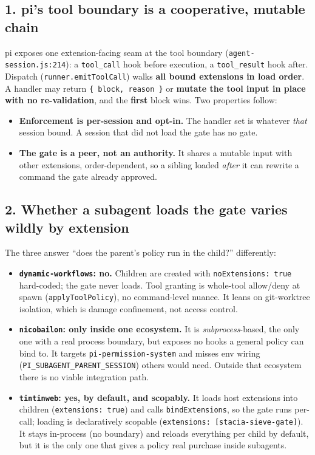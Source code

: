 \documentclass[11pt]{article}
\newcommand{\code}[1]{\texttt{#1}}
\begin{document}
\subsection*{1. pi's tool boundary is a cooperative, mutable chain}

pi exposes one extension-facing seam at the tool boundary
(\code{agent-session.js:214}): a \code{tool\_call} hook before execution, a
\code{tool\_result} hook after. Dispatch (\code{runner.emitToolCall}) walks
\textbf{all bound extensions in load order}. A handler may return
\code{\{ block, reason \}} or \textbf{mutate the tool input in place with no
re-validation}, and the \textbf{first} block wins. Two properties follow:

\begin{itemize}
  \item \textbf{Enforcement is per-session and opt-in.} The handler set is
    whatever \emph{that} session bound. A session that did not load the gate has
    no gate.
  \item \textbf{The gate is a peer, not an authority.} It shares a mutable input
    with other extensions, order-dependent, so a sibling loaded \emph{after} it
    can rewrite a command the gate already approved.
\end{itemize}

\subsection*{2. Whether a subagent loads the gate varies wildly by extension}

The three answer ``does the parent's policy run in the child?'' differently:

\begin{itemize}
  \item \textbf{\code{dynamic-workflows}: no.} Children are created with
    \code{noExtensions: true} hard-coded; the gate never loads. Tool granting is
    whole-tool allow/deny at spawn (\code{applyToolPolicy}), no command-level
    nuance. It leans on git-worktree isolation, which is damage confinement, not
    access control.
  \item \textbf{\code{nicobailon}: only inside one ecosystem.} It is
    \emph{subprocess}-based, the only one with a real process boundary, but
    exposes no hooks a general policy can bind to. It targets
    \code{pi-permission-system} and misses env wiring
    (\code{PI\_SUBAGENT\_PARENT\_SESSION}) others would need. Outside that
    ecosystem there is no viable integration path.
  \item \textbf{\code{tintinweb}: yes, by default, and scopably.} It loads host
    extensions into children (\code{extensions: true}) and calls
    \code{bindExtensions}, so the gate runs per-call; loading is declaratively
    scopable (\code{extensions: [stacia-sieve-gate]}). It stays in-process (no
    boundary) and reloads everything per child by default, but it is the only one
    that gives a policy real purchase inside subagents.
\end{itemize}
\end{document}
